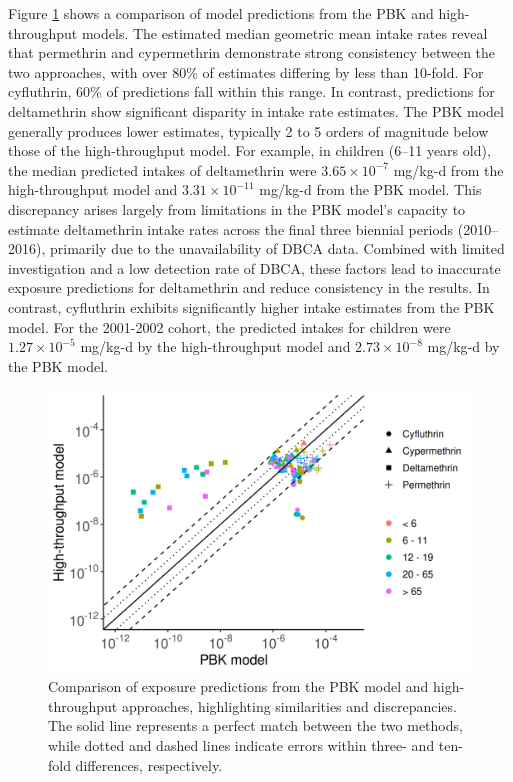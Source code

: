 \documentclass[toxics,article,submit,pdftex,moreauthors]{Definitions/mdpi}
\begin{document}
Figure \ref{fig:fig4} shows a comparison of model predictions from the PBK and
high-throughput models. The estimated median geometric mean intake rates
reveal that permethrin and cypermethrin demonstrate strong consistency between
the two approaches, with over 80\% of estimates differing by less than 10-fold.
For cyfluthrin, 60\% of predictions fall within this range. In contrast,
predictions for deltamethrin show significant disparity in intake rate
estimates. The PBK model generally produces lower estimates, typically 2 to 5
orders of magnitude below those of the high-throughput model. For example, in
children (6–11 years old), the median predicted intakes of deltamethrin were
\(3.65 \times 10^{-7}\) mg/kg-d from the high-throughput model and \(3.31
\times 10^{-11}\) mg/kg-d  from the PBK model. This discrepancy
arises largely from limitations in the PBK model’s capacity to estimate
deltamethrin intake rates across the final three biennial periods (2010–2016),
primarily due to the unavailability of DBCA data. Combined with limited
investigation and a low detection rate of DBCA, these factors lead to
inaccurate exposure predictions for deltamethrin and reduce consistency in the
results. In contrast, cyfluthrin exhibits significantly higher intake estimates
from the PBK model. For the 2001-2002 cohort, the predicted intakes for children
were \(1.27 \times 10^{-5}\) mg/kg-d by the high-throughput model and \(2.73
\times 10^{-8}\) mg/kg-d by the PBK model.
 


\begin{figure}[H]
\centering
\begin{adjustwidth}{-2cm}{}
\centering
\includegraphics[width=\linewidth]{figures/fig4_comparison}
\hfill
\end{adjustwidth}
\caption{Comparison of exposure predictions from the PBK model and
high-throughput approaches, highlighting similarities and discrepancies. The
solid line represents a perfect match between the two methods, while dotted and
dashed lines indicate errors within three- and ten-fold differences,
respectively.\label{fig:fig4}}
\end{figure}
\end{document}

